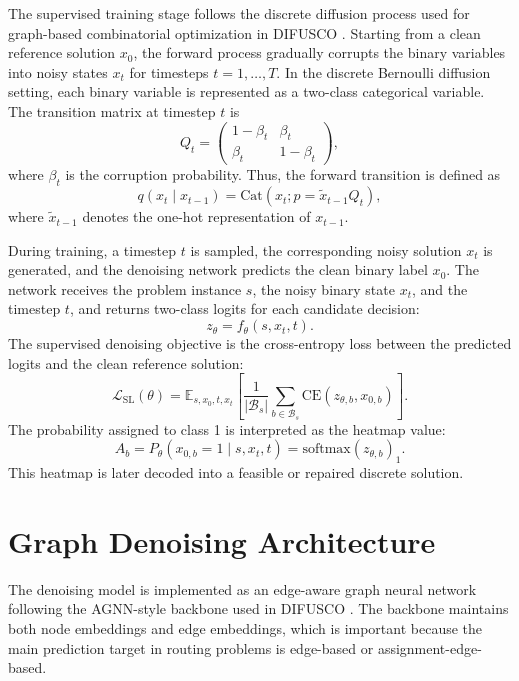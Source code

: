 The supervised training stage follows the discrete diffusion process used for graph-based combinatorial optimization in DIFUSCO \citep{sun2023difusco}. Starting from a clean reference solution \(x_0\), the forward process gradually corrupts the binary variables into noisy states \(x_t\) for timesteps \(t=1,\ldots,T\). In the discrete Bernoulli diffusion setting, each binary variable is represented as a two-class categorical variable. The transition matrix at timestep \(t\) is
\[
    Q_t =
    \begin{pmatrix}
    1-\beta_t & \beta_t \\
    \beta_t & 1-\beta_t
    \end{pmatrix},
\]
where \(\beta_t\) is the corruption probability. Thus, the forward transition is defined as
\[
    q(x_t \mid x_{t-1})
    =
    \mathrm{Cat}
    \left(
        x_t;
        p=\tilde{x}_{t-1}Q_t
    \right),
\]
where \(\tilde{x}_{t-1}\) denotes the one-hot representation of \(x_{t-1}\).

During training, a timestep \(t\) is sampled, the corresponding noisy solution \(x_t\) is generated, and the denoising network predicts the clean binary label \(x_0\). The network receives the problem instance \(s\), the noisy binary state \(x_t\), and the timestep \(t\), and returns two-class logits for each candidate decision:
\[
    z_\theta = f_\theta(s,x_t,t).
\]
The supervised denoising objective is the cross-entropy loss between the predicted logits and the clean reference solution:
\[
    \mathcal{L}_{\mathrm{SL}}(\theta)
    =
    \mathbb{E}_{s,x_0,t,x_t}
    \left[
        \frac{1}{|\mathcal{B}_s|}
        \sum_{b \in \mathcal{B}_s}
        \mathrm{CE}
        \left(
            z_{\theta,b}, x_{0,b}
        \right)
    \right].
\]
The probability assigned to class 1 is interpreted as the heatmap value:
\[
    A_b
    =
    P_\theta(x_{0,b}=1 \mid s,x_t,t)
    =
    \mathrm{softmax}(z_{\theta,b})_1.
\]
This heatmap is later decoded into a feasible or repaired discrete solution.

\section{Graph Denoising Architecture}
\label{sec:graph-denoising-architecture}

The denoising model is implemented as an edge-aware graph neural network following the AGNN-style backbone used in DIFUSCO \citep{sun2023difusco}. The backbone maintains both node embeddings and edge embeddings, which is important because the main prediction target in routing problems is edge-based or assignment-edge-based.


